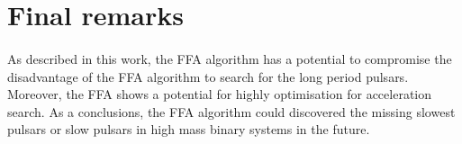 \documentclass[../chapter1/thesis_msc.tex]{subfiles}
\begin{document}

\section{Final remarks}
\paragraph{} As described in this work, the FFA algorithm has a potential to compromise the disadvantage of the FFA algorithm to search for the long period pulsars. Moreover, the FFA shows a potential for highly optimisation for acceleration search. As a conclusions, the FFA algorithm could discovered the missing slowest pulsars or slow pulsars in high mass binary systems in the future.  
\end{document}
